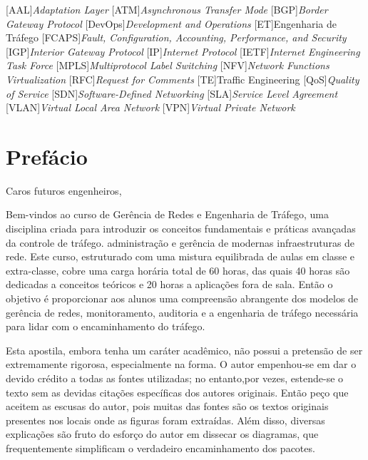 \documentclass[article]{memoir}
\begin{document}

\begin{acronym}
	\begin{footnotesize}
	[AAL]{\textit{Adaptation Layer}} 
	[ATM]{\textit{Asynchronous Transfer Mode}}
	[BGP]{\textit{Border Gateway Protocol}}
	[DevOps]{\textit{Development and Operations}}
	[ET]{Engenharia de Tráfego}
	[FCAPS]{\textit{Fault, Configuration, Accounting, Performance, and Security}}
	[IGP]{\textit{Interior Gateway Protocol}}
	[IP]{\textit{Internet Protocol}}
	[IETF]{\textit{Internet Engineering Task Force}}
	[MPLS]{\textit{Multiprotocol Label Switching}}
	[NFV]{\textit{Network Functions Virtualization}}
	[RFC]{\textit{Request for Comments}}
	[TE]{Traffic Engineering}
	[QoS]{\textit{Quality of Service}}
	[SDN]{\textit{Software-Defined Networking}}
	[SLA]{\textit{Service Level Agreement}}
	[VLAN]{\textit{Virtual Local Area Network}}
	[VPN]{\textit{Virtual Private Network}}
\end{footnotesize}
\end{acronym}

\section*{Prefácio}

Caros futuros engenheiros, 

Bem-vindos ao curso de Gerência de Redes e Engenharia de Tráfego, uma disciplina  criada para introduzir os conceitos fundamentais e práticas avançadas da controle de tráfego. administração e gerência de modernas infraestruturas de rede. Este curso, estruturado com uma mistura equilibrada de aulas em classe e extra-classe, cobre uma carga horária total de 60 horas, das quais 40 horas são dedicadas a conceitos teóricos e 20 horas a aplicações fora de sala. Então o objetivo é proporcionar aos alunos uma compreensão abrangente dos modelos de gerência de redes, monitoramento, auditoria e a engenharia de tráfego necessária para lidar com o encaminhamento do tráfego.


Esta apostila, embora tenha um caráter acadêmico, não possui a pretensão de ser extremamente rigorosa, especialmente na forma. O autor empenhou-se em dar o devido crédito a todas as fontes utilizadas; no entanto,por vezes, estende-se o texto sem as devidas citações específicas dos autores originais. Então peço que aceitem as escusas do autor, pois muitas das fontes são os textos originais presentes nos locais onde as figuras foram extraídas. Além disso, diversas explicações são fruto do esforço do autor em dissecar os diagramas, que frequentemente simplificam o verdadeiro encaminhamento dos pacotes.
\end{document}
